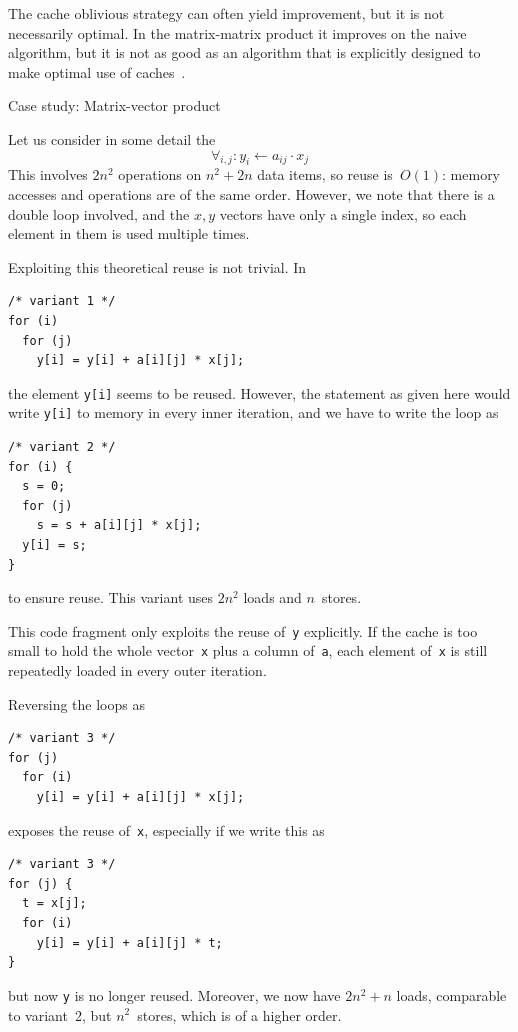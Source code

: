 The cache oblivious strategy can often yield improvement, but it is
not necessarily optimal. In the matrix-matrix product it improves on
the naive algorithm, but it is not as good as an algorithm that is
explicitly designed to make optimal use of
caches~\cite{GotoGeijn:2008:Anatomy}.


 {Case study: Matrix-vector product}
\label{sec:mvp-opt}

Let us consider in some detail
the 
\[ \forall_{i,j}\colon y_i\leftarrow a_{ij}\cdot x_j \] This involves $2n^2$
operations on $n^2+2n$ data items, so reuse is~$O(1)$: memory accesses
and operations are of the same order. However, we note that there is a
double loop involved, and the $x,y$ vectors have only a single index,
so each element in them is used multiple times.

Exploiting this theoretical reuse is not trivial. In
\begin{verbatim}
/* variant 1 */
for (i)
  for (j)
    y[i] = y[i] + a[i][j] * x[j];
\end{verbatim}
the element \texttt{y[i]} seems to be reused. However, the statement
as given here would write \texttt{y[i]} to memory in every inner
iteration, and we have to write the loop as
\begin{verbatim}
/* variant 2 */
for (i) {
  s = 0;
  for (j)
    s = s + a[i][j] * x[j];
  y[i] = s;
}
\end{verbatim}
to ensure reuse. This variant uses $2n^2$ loads and $n$~stores.

This code fragment only exploits the reuse
of~\texttt{y} explicitly. If the cache is too small to hold the whole
vector~\texttt{x} plus a column of~\texttt{a}, each element
of~\texttt{x} is still repeatedly loaded in every outer iteration.

Reversing the loops as
\begin{verbatim}
/* variant 3 */
for (j)
  for (i)
    y[i] = y[i] + a[i][j] * x[j];
\end{verbatim}
exposes the reuse of~\texttt{x}, especially if we write this as
\begin{verbatim}
/* variant 3 */
for (j) {
  t = x[j];
  for (i)
    y[i] = y[i] + a[i][j] * t;
}
\end{verbatim}
but now \texttt{y} is no longer
reused. Moreover, we now have $2n^2+n$ loads, comparable to variant~2,
but $n^2$~stores, which is of a higher order.

